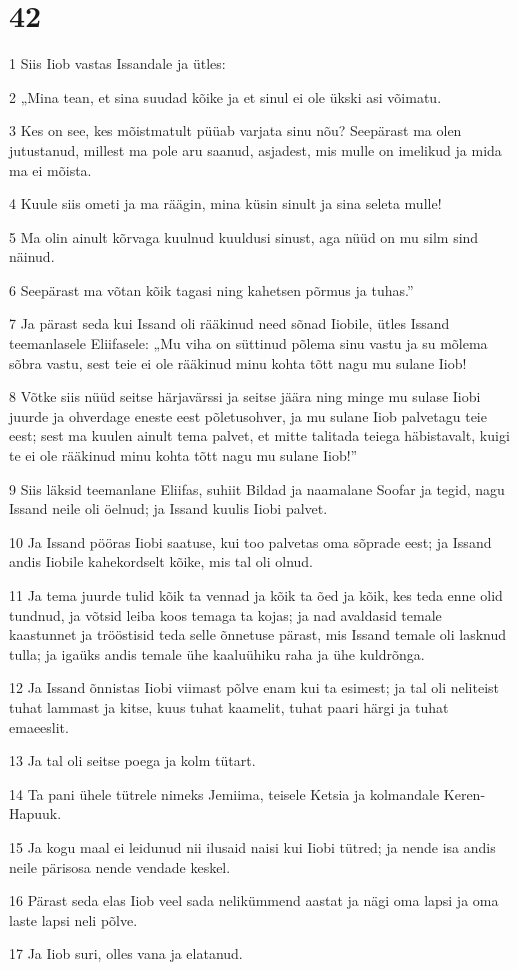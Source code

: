\chapter{42}

\par 1 Siis Iiob vastas Issandale ja ütles:
\par 2 „Mina tean, et sina suudad kõike ja et sinul ei ole ükski asi võimatu.
\par 3 Kes on see, kes mõistmatult püüab varjata sinu nõu? Seepärast ma olen jutustanud, millest ma pole aru saanud, asjadest, mis mulle on imelikud ja mida ma ei mõista.
\par 4 Kuule siis ometi ja ma räägin, mina küsin sinult ja sina seleta mulle!
\par 5 Ma olin ainult kõrvaga kuulnud kuuldusi sinust, aga nüüd on mu silm sind näinud.
\par 6 Seepärast ma võtan kõik tagasi ning kahetsen põrmus ja tuhas.”
\par 7 Ja pärast seda kui Issand oli rääkinud need sõnad Iiobile, ütles Issand teemanlasele Eliifasele: „Mu viha on süttinud põlema sinu vastu ja su mõlema sõbra vastu, sest teie ei ole rääkinud minu kohta tõtt nagu mu sulane Iiob!
\par 8 Võtke siis nüüd seitse härjavärssi ja seitse jäära ning minge mu sulase Iiobi juurde ja ohverdage eneste eest põletusohver, ja mu sulane Iiob palvetagu teie eest; sest ma kuulen ainult tema palvet, et mitte talitada teiega häbistavalt, kuigi te ei ole rääkinud minu kohta tõtt nagu mu sulane Iiob!”
\par 9 Siis läksid teemanlane Eliifas, suhiit Bildad ja naamalane Soofar ja tegid, nagu Issand neile oli öelnud; ja Issand kuulis Iiobi palvet.
\par 10 Ja Issand pööras Iiobi saatuse, kui too palvetas oma sõprade eest; ja Issand andis Iiobile kahekordselt kõike, mis tal oli olnud.
\par 11 Ja tema juurde tulid kõik ta vennad ja kõik ta õed ja kõik, kes teda enne olid tundnud, ja võtsid leiba koos temaga ta kojas; ja nad avaldasid temale kaastunnet ja trööstisid teda selle õnnetuse pärast, mis Issand temale oli lasknud tulla; ja igaüks andis temale ühe kaaluühiku raha ja ühe kuldrõnga.
\par 12 Ja Issand õnnistas Iiobi viimast põlve enam kui ta esimest; ja tal oli neliteist tuhat lammast ja kitse, kuus tuhat kaamelit, tuhat paari härgi ja tuhat emaeeslit.
\par 13 Ja tal oli seitse poega ja kolm tütart.
\par 14 Ta pani ühele tütrele nimeks Jemiima, teisele Ketsia ja kolmandale Keren-Hapuuk.
\par 15 Ja kogu maal ei leidunud nii ilusaid naisi kui Iiobi tütred; ja nende isa andis neile pärisosa nende vendade keskel.
\par 16 Pärast seda elas Iiob veel sada nelikümmend aastat ja nägi oma lapsi ja oma laste lapsi neli põlve.
\par 17 Ja Iiob suri, olles vana ja elatanud.



